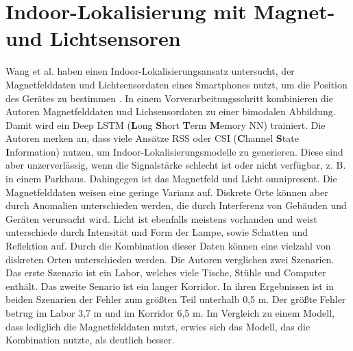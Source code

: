 \section{Indoor-Lokalisierung mit Magnet- und Lichtsensoren}
Wang et al. haben einen Indoor-Lokalisierungsansatz untersucht, der Magnetfelddaten und
Lichtsensordaten eines Smartphones nutzt, um die Position des Gerätes zu bestimmen \cite{wang2018deepml}.
In einem Vorverarbeitungsschritt kombinieren die Autoren Magnetfelddaten und Lichsensordaten zu einer bimodalen Abbildung.
Damit wird ein Deep LSTM (\textbf{L}ong  \textbf{S}hort \textbf{T}erm \textbf{M}emory NN) trainiert.
\newline
\newline
Die Autoren merken an, dass viele Ansätze RSS oder CSI (\textbf{C}hannel \textbf{S}tate \textbf{I}nformation) nutzen, um Indoor-Lokalisierungsmodelle zu generieren.
Diese sind aber unzerverlässig, wenn die Signalstärke schlecht ist oder nicht verfügbar, z. B. in einem Parkhaus.
Dahingegen ist das Magnetfeld und Licht omnipresent.
Die Magnetfelddaten weisen eine geringe Varianz auf.
Diskrete Orte können aber durch Anomalien unterschieden werden, die durch Interferenz von Gebäuden und Geräten verursacht wird.
Licht ist ebenfalls meistens vorhanden und weist unterschiede durch Intensität und Form der Lampe, sowie Schatten und Reflektion auf.
Durch die Kombination dieser Daten können eine vielzahl von diskreten Orten unterschieden werden.
\newline
\newline
Die Autoren verglichen zwei Szenarien.
Das erste Szenario ist ein Labor, welches viele Tische, Stühle und Computer enthält.
Das zweite Senario ist ein langer Korridor.
In ihren Ergebnissen ist in beiden Szenarien der Fehler zum größten Teil unterhalb 0,5 m.
Der größte Fehler betrug im Labor 3,7 m und im Korridor 6,5 m.
Im Vergleich zu einem Modell, dass lediglich die Magnetfelddaten nutzt, erwies sich das Modell, das die Kombination nutzte, als deutlich besser.